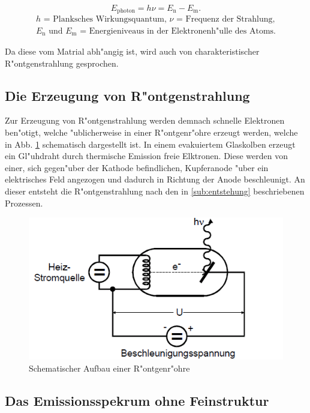 		\begin{equation}
			E_{\text{photon}} = h \nu = E_\mathrm{n} - E_\mathrm{m}. \label{gleich_1}
		\end{equation}
		\begin{eqnarray*}
			\text{$h$ = Planksches Wirkungsquantum, $\nu$ = Frequenz der Strahlung,}\\
			\text{$E_\mathrm{n}$ und $E_\mathrm{m}$ = Energieniveaus in der Elektronenh"ulle des Atoms.}
		\end{eqnarray*}
	
		{Da diese vom Matrial abh"angig ist, wird auch von charakteristischer R"ontgenstrahlung gesprochen.}
		
	\subsection{Die Erzeugung von R"ontgenstrahlung}
	\label{sub:erzeugung}

		Zur Erzeugung von R"ontgenstrahlung werden demnach schnelle Elektronen ben"otigt, welche "ublicherweise in einer R"ontgenr"ohre erzeugt werden, welche in Abb. \ref{roentgenroehre} schematisch dargestellt ist.
		In einem evakuiertem Glaskolben erzeugt ein Gl"uhdraht durch thermische Emission freie Elktronen. 
		Diese werden von einer, sich gegen"uber der Kathode be\-find\-lich\-en, Kupferanode "uber ein elektrisches Feld angezogen und dadurch in Richtung der Anode beschleunigt.
		An dieser entsteht die R"ontgenstrahlung nach den in \ref{sub:entstehung} beschriebenen Prozessen.

		\begin{figure}[htbp]
			\centering
			\includegraphics[width = 12cm]{img/Roentgenroehre.png}
			\caption{Schematischer Aufbau einer R"ontgenr"ohre}
			\label{roentgenroehre}
		\end{figure}

	\subsection{Das Emissionsspekrum ohne Feinstruktur}
	\label{sub:ohnefein}

